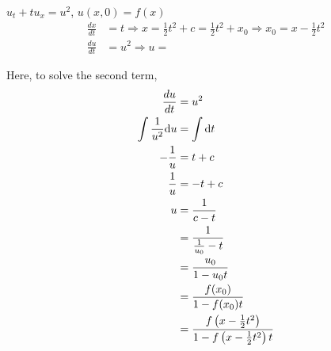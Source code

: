 \documentclass{article}
\begin{document}
\ex $u_t + tu_x = u^2$, $u(x, 0) = f(x)$
%
\begin{align}
  \frac{dx}{dt} & = t \Rightarrow x = \frac{1}{2} t^2 + c
  = \frac{1}{2} t^2 + x_0 \Rightarrow x_0 = x - \frac{1}{2} t^2\\
  \frac{du}{dt} & = u^2 \Rightarrow u =
\end{align}

Here, to solve the second term,
%
\begin{align}
  \frac{du}{dt} & = u^2\\
  \int \frac{1}{u^2} \text du & = \int \text dt\\
  -\frac{1}{u} & = t + c\\
  \frac{1}{u} & = -t + c\\
  u & = \frac{1}{c - t}\\
  & = \frac{1}{\frac{1}{u_0} - t}\\
  & = \frac{u_0}{1 - u_0 t}\\
  & = \frac{f(x_0)}{1 - f(x_0)t}\\
  & = \frac{f\left(x - \frac{1}{2}t^2\right)}
  {1 - f\left(x - \frac{1}{2}t^2\right)t}
\end{align}
\end{document}
